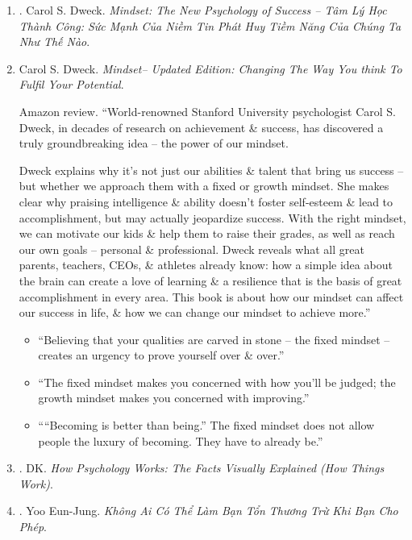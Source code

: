\documentclass{article}
\begin{document}
\begin{enumerate}
	\item \cite{Dweck_mindset_VN}. {\sc Carol S. Dweck}. {\it Mindset: The New Psychology of Success -- Tâm Lý Học Thành Công: Sức Mạnh Của Niềm Tin Phát Huy Tiềm Năng Của Chúng Ta Như Thế Nào}.\hfill{\sf[done]}
	
	\item {\sc Carol S. Dweck}. {\it Mindset-- Updated Edition: Changing The Way You think To Fulfil Your Potential}. {}
	
	{\sf Amazon review.} ``World-renowned Stanford University psychologist {\sc Carol S. Dweck}, in decades of research on achievement \& success, has discovered a truly groundbreaking idea -- the power of our mindset.
	
	{\sc Dweck} explains why it's not just our abilities \& talent that bring us success -- but whether we approach them with a fixed or growth mindset. She makes clear why praising intelligence \& ability doesn't foster self-esteem \& lead to accomplishment, but may actually jeopardize success. With the right mindset, we can motivate our kids \& help them to raise their grades, as well as reach our own goals -- personal \& professional. {\sc Dweck} reveals what all great parents, teachers, CEOs, \& athletes already know: how a simple idea about the brain can create a love of learning \& a resilience that is the basis of great accomplishment in every area. This book is about how our mindset can affect our success in life, \& how we can change our mindset to achieve more.''
	\begin{itemize}
		\item ``Believing that your qualities are carved in stone -- the fixed mindset -- creates an urgency to prove yourself over \& over.''
		\item ``The fixed mindset makes you concerned with how you'll be judged; the growth mindset makes you concerned with improving.''
		\item ````Becoming is better than being.'' The fixed mindset does not allow people the luxury of becoming. They have to already be.''
	\end{itemize}
	
	\item \cite{DK2018}. DK. {\it How Psychology Works: The Facts Visually Explained (How Things Work)}.\hfill{\sf[reading]}
	
	\item \cite{Eun-Jung_hurt_VN}. Yoo Eun-Jung. {\it Không Ai Có Thể Làm Bạn Tổn Thương Trừ Khi Bạn Cho Phép}.\hfill{\sf[done]}
		

\end{enumerate}
\end{document}
